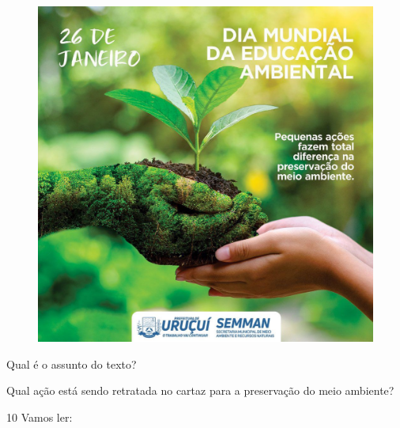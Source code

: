 \begin{figure}[H]
\centering
\includegraphics[width=.8\textwidth]{media/image123.jpeg}
\end{figure}


\begin{escolha}
\item Qual é o assunto do texto?\\

\item Qual ação está sendo retratada no cartaz para a preservação do meio ambiente?\\
\end{escolha}

\num{10} Vamos ler:

